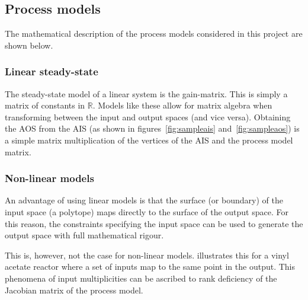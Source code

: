 \subsection{Process models}
The mathematical description of the process models considered in this project are shown below.
\subsubsection{Linear steady-state}
The steady-state model of a linear system is the gain-matrix.
This is simply a matrix of constants in $\mathbb{R}$.
Models like these allow for matrix algebra when transforming between the input and output spaces (and vice versa).
Obtaining the AOS from the AIS (as shown in figures~\ref{fig:sampleais} and~\ref{fig:sampleaos}) is a simple matrix multiplication of the vertices of the AIS and the process model matrix.
\subsubsection{Non-linear models}
An advantage of using linear models is that the surface (or boundary) of the input space (a polytope) maps directly to the surface of the output space.
For this reason, the constraints specifying the input space can be used to generate the output space with full mathematical rigour.

This is, however, not the case for non-linear models.
\citet{opidealrx} illustrates this for a vinyl acetate reactor where a set of inputs map to the same point in the output.
This phenomena of input multiplicities can be ascribed to rank deficiency of the Jacobian matrix of the process model.   

